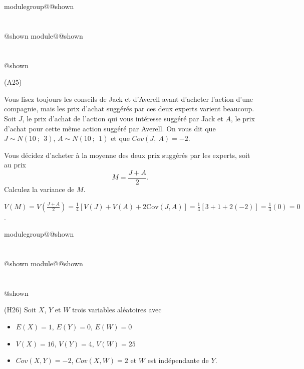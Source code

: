 \documentclass{Evaluation}
\makeatletter
\newcommand{\currentmodulekey}{}
\newcommand{\currentmoduletitle}{}
\newcommand{\currentgroupkey}{}
\newcommand{\currentgrouptitle}{}
\newcommand{\showmoduleifneeded}{%
  \ifx\currentgroupkey\empty\else
    \expandafter\ifx\csname modulegroup@\currentgroupkey @shown\endcsname\relax
      \section*{\currentgrouptitle}%
      \expandafter\gdef\csname modulegroup@\currentgroupkey @shown\endcsname{1}%
    \fi
  \fi
  \expandafter\ifx\csname module@\currentmodulekey @shown\endcsname\relax
    \section*{\currentmoduletitle}%
    \expandafter\gdef\csname module@\currentmodulekey @shown\endcsname{1}%
  \fi
}
\newenvironment{A25}{\showmoduleifneeded}{}
\newenvironment{H26}{\showmoduleifneeded}{}
\makeatother
\begin{document}
\begin{questions}
\begin{A25}
\question\label{2F} (A25)

Vous lisez toujours les conseils de Jack et d'Averell avant d'acheter l'action
d'une compagnie, mais les prix d'achat suggérés par ces deux experts
varient beaucoup. Soit $J$, le prix d'achat de l'action qui vous intéresse suggéré
par Jack et $A$, le prix d'achat pour cette même action suggéré par Averell.
On vous dit que $J\sim N(10~;~~3)$, $A\sim N(10~;~~1)$ et que $Cov(J,~A)=-2$.

Vous décidez d'acheter à la moyenne des deux
    prix suggérés par les experts, soit au prix 
    $$M = \frac{J+A}{2}.$$
Calculez la variance de $M$.

\begin{solution}
    $V(M)=V\left(\frac{J+A}{2}\right)=\frac{1}{4}[V(J)+V(A)+2\text{Cov}(J,A)]=\frac{1}{4}[3+1+2(-2)]=\frac{1}{4}(0)=0$.
\end{solution}
\end{A25}



\begin{H26}
\question\label{cov}
(H26)
Soit $X$, $Y$ et $W$ trois variables aléatoires avec
\begin{itemize}
\item $E(X)=1$, $E(Y)=0$, $E(W)=0$
\item $V(X)=16$, $V(Y)=4$, $V(W)=25$
\item $Cov(X,Y)=-2$, $Cov(X,W)=2$ et $W$ est indépendante de $Y$.
\end{itemize}


\end{H26}



\end{questions}
\end{document}
